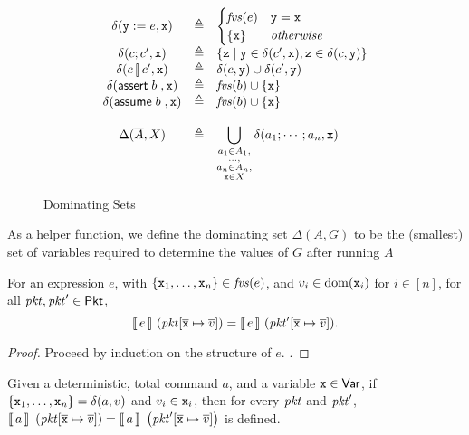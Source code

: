 \begin{figure}[tpb]
  \[\begin{array}{c>{\triangleq}cl}
      \delta(\var y := e,\var x) && \begin{cases}
        \fvs(e) &\var y = \var x\\
        \{\var x\} & \textit{otherwise} \end{cases} \\
      \delta(c;c', \var x) && \left\{\var z \mid \var y \in \delta(c', \var x), \var z \in \delta(c, \var y)\right\} \\
      \delta(c\angel c', \var x) && \delta (c, \var y) \cup \delta(c', \var y) \\
      \delta(\assert b, \var x) && \fvs(b) \cup \{\var x\} \\
      \delta(\assume b, \var x) && \fvs(b) \cup \{\var x\} \\\\
      \Delta(\vec A, X) && \displaystyle\bigcup_{\substack{a_1\in A_1,\\\ldots,\\ a_n \in A_n, \\\var x \in X}}\delta(a_1;\cdots; a_n,\var x)                      
    \end{array}\]
  \caption{Dominating Sets}
  \label{fig:dominating-sets }
\end{figure}



As a helper function, we define the dominating set $\Delta(A,G)$ to be
the (smallest) set of variables required to determine the values of $G$
after running $A$

\begin{lemma}
  \label{lem:def-fvs-expr}
  For an expression $e$, with
  $\{\texttt{x}_1, \ldots, \texttt{x}_n\} \in \mathit{fvs}(e)$, and
  $v_i \in \mathrm{dom}(\texttt{x}_i)$ for $i \in [n]$, for all
  $\mathit{pkt}, \mathit{pkt}' \in \mathsf{Pkt}$,
  \[\llbracket\,e\,\rrbracket~(\mathit{pkt}[\overline{\texttt{x}} \mapsto \overline{v}]) =
  \llbracket\,e\,\rrbracket~(\mathit{pkt}'[\overline{\texttt{x}} \mapsto \overline{v}]).\]
\end{lemma}

\begin{proof}
  Proceed by induction on the structure of $e$.  .
\end{proof}

\begin{lemma}
  \label{lem:delta-dom}
  Given a deterministic, total command $a$, and a variable
  $\texttt{x} \in \mathsf{Var}$, if
  $\{\texttt{x}_1, \ldots, \texttt{x}_n\} = \delta(a,v)$ and
  $v_i \in \texttt{x}_i$, then for every $\mathit{pkt}$ and $\mathit{pkt}'$,
  $\llbracket\,a\,\rrbracket~\left(\mathit{pkt}[\overline{\texttt{x}} \mapsto \overline{v}]\right)
  = \llbracket\,a\,\rrbracket~\left(\mathit{pkt}'[\overline{\texttt{x}} \mapsto \overline{v}]\right)$
  is defined.
\end{lemma}

